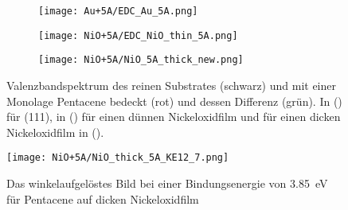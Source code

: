         \begin{figure}
            \centering
            \begin{subfigure}[t]{0.30\textwidth}
                \centering
                \texttt{[image: Au+5A/EDC\_Au\_5A.png]}
                \subcaption{}
                \label{fig:EDC_Au+5A}
            \end{subfigure}
            \begin{subfigure}[t]{0.30\textwidth}
                \centering
                \texttt{[image: NiO+5A/EDC\_NiO\_thin\_5A.png]}
                \subcaption{}
                \label{fig:EDC_NiO_thin+5A}
            \end{subfigure}
            \begin{subfigure}[t]{0.30\textwidth}
                \centering
                \texttt{[image: NiO+5A/NiO\_5A\_thick\_new.png]}
                \subcaption{}
                \label{fig:EDC_NiO+5A}
            \end{subfigure}
            \caption{Valenzbandspektrum des reinen Substrates (schwarz) und mit einer Monolage Pentacene bedeckt (rot) und dessen Differenz (grün).
            In () für (111), in () für einen dünnen Nickeloxidfilm und für einen dicken Nickeloxidfilm in ().}
        \end{figure}


        \begin{figure}
            \centering
            \texttt{[image: NiO+5A/NiO\_thick\_5A\_KE12\_7.png]}
            \caption{Das winkelaufgelöstes Bild bei einer Bindungsenergie von \SI{3.85}{\electronvolt} für Pentacene auf dicken Nickeloxidfilm} %
            \label{fig:MOT_NiO+5A}
        \end{figure}

